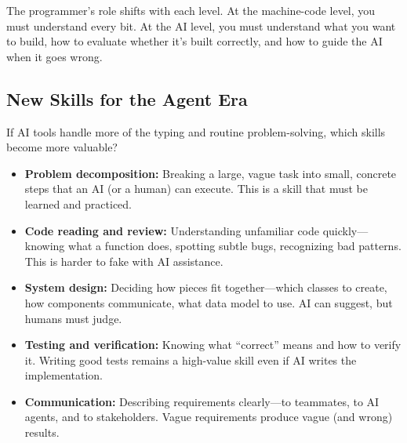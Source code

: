 \documentclass[11pt,letterpaper]{article}
\begin{document}
\begin{center}
\end{center}

The programmer's role shifts with each level. At the machine-code level, you must understand every bit. At the AI level, you must understand what you want to build, how to evaluate whether it's built correctly, and how to guide the AI when it goes wrong.

\subsection{New Skills for the Agent Era}

If AI tools handle more of the typing and routine problem-solving, which skills become more valuable?

\begin{itemize}[itemsep=4pt]
    \item \textbf{Problem decomposition:} Breaking a large, vague task into small, concrete steps that an AI (or a human) can execute. This is a skill that must be learned and practiced.

    \item \textbf{Code reading and review:} Understanding unfamiliar code quickly---knowing what a function does, spotting subtle bugs, recognizing bad patterns. This is harder to fake with AI assistance.

    \item \textbf{System design:} Deciding how pieces fit together---which classes to create, how components communicate, what data model to use. AI can suggest, but humans must judge.

    \item \textbf{Testing and verification:} Knowing what ``correct'' means and how to verify it. Writing good tests remains a high-value skill even if AI writes the implementation.

    \item \textbf{Communication:} Describing requirements clearly---to teammates, to AI agents, and to stakeholders. Vague requirements produce vague (and wrong) results.
\end{itemize}
\end{document}
